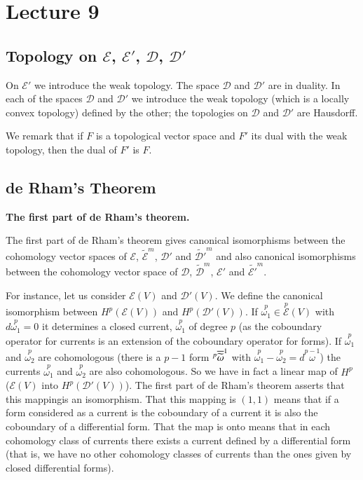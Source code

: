\chapter{Lecture 9}

\section*{Topology on $\mathscr{E}$, $\mathscr{E}'$, $\mathscr{D}$,
  $\mathscr{D}'$}\pageoriginale

On $\mathscr{E}'$ we introduce the weak topology. The space
$\mathscr{D}$ and $\mathscr{D}'$ are in duality. In each of the spaces
$\mathscr{D}$ and $\mathscr{D}'$ we introduce the weak topology (which
is a locally convex topology) defined by the other; the topologies on
$\mathscr{D}$ and $\mathscr{D}'$ are Hausdorff.

We remark that if $F$ is a topological vector space and $F'$ its dual
with the weak topology, then the dual of $F'$ is $F$.

\section*{de Rham's Theorem}

\noindent
{\bf The first part of de Rham's theorem.}
\smallskip

The first part of de Rham's theorem gives canonical isomorphisms
between the cohomology vector spaces of $\mathscr{E}$,
$\widetilde{\mathscr{E}}^{m}$, $\mathscr{D}'$ and
$\widetilde{\mathscr{D}'}^{m}$ and also canonical isomorphisms between
the cohomology vector space of $\mathscr{D}$,
$\widetilde{\mathscr{D}}^{m}$, $\mathscr{E}'$ and
$\widetilde{\mathscr{E}'}^{m}$. 

For instance, let us consider $\mathscr{E}(V)$ and
$\mathscr{D}'(V)$. We define the canonical isomorphism between
$H^{p}(\mathscr{E}(V))$ and $H^{p}(\mathscr{D}'(V))$. If
$\overset{p}{\omega_{1}}\in \overset{p}{\mathscr{E}}(V)$ with
$d\overset{p}{\omega_{1}}=0$ it determines a closed current,
$\overset{p}{\omega_{1}}$ of degree $p$ (as the coboundary operator
for currents is an extension of the coboundary operator for forms). If
$\overset{p}{\omega_{1}}$ and $\overset{p}{\omega_{2}}$ are
cohomologous (\iec there is a $p-1$ form
${}^{p}\overline{\widetilde{\omega}}^{1}$ with
$\overset{p}{\omega_{1}}-\overset{p}{\omega_{2}}=d\overset{p-1}{\omega}$)
the currents $\overset{p}{\omega_{1}}$ and $\overset{p}{\omega_{2}}$
are also cohomologous. So we have in fact a linear map of $H^{p}$
($\mathscr{E}(V)$ into $H^{p}(\mathscr{D}'(V))$). The first part of de
Rham's theorem asserts that this mapping\pageoriginale is an
isomorphism. That this mapping is $(1,1)$ means that if a form
considered as a current is the coboundary of a current it is also the
coboundary of a differential form. That the map is onto means that in
each cohomology class of currents there exists a current defined by a
differential form (that is, we have no other cohomology classes of
currents than the ones given by closed differential forms).

